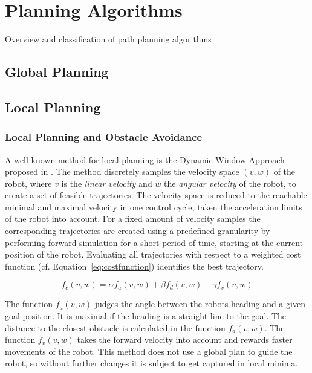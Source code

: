 \chapter{Planning Algorithms}\label{ch:planningalgorithms}
Overview and classification of path planning algorithms

\section{Global Planning}\label{sec:global}

\section{Local Planning}\label{sec:local}
\subsection{Local Planning and Obstacle Avoidance}
A well known method for local planning is the Dynamic Window Approach proposed in \cite{DWA1997}. 
The method discretely samples the velocity space $(v,w)$ of the robot, where $v$ is the \emph{linear velocity} and $w$ the \emph{angular velocity} of the robot, to create a set of feasible trajectories.
The velocity space is reduced to the reachable minimal and maximal velocity in one control cycle, taken the acceleration limits of the robot into account.
For a fixed amount of velocity samples the corresponding trajectories are created using a predefined granularity by performing forward simulation for a short period of time, starting at the current position of the robot. Evaluating all trajectories with respect to a weighted cost function (cf. Equation~\ref{eq:costfunction}) identifies the best trajectory.

\begin{equation}
   f_c(v,w)=\alpha f_a(v,w)+\beta f_d(v,w)+\gamma f_v(v,w)
   \label{eq:costfunction}
\end{equation}

The function $f_a(v,w)$ judges the angle between the robots heading and a given goal position.
It is maximal if the heading is a straight line to the goal.
The distance to the closest obstacle is calculated in the function $f_d(v,w)$.
The function $f_v(v,w)$ takes the forward velocity into account and rewards faster movements of the robot.
This method does not use a global plan to guide the robot, so without further changes it is subject to get captured in local minima.


